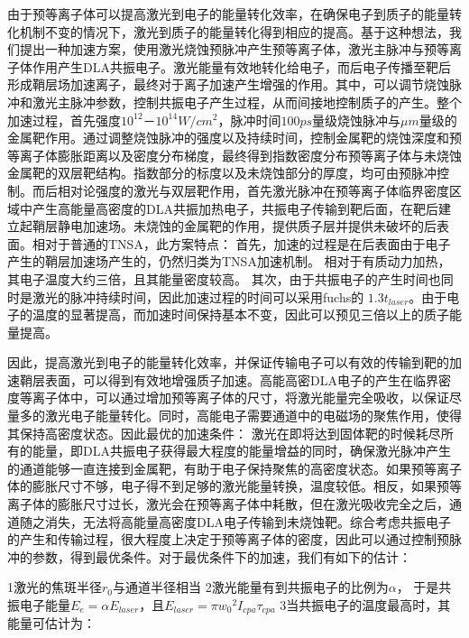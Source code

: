 由于预等离子体可以提高激光到电子的能量转化效率，在确保电子到质子的能量转化机制不变的情况下，激光到质子的能量转化得到相应的提高。基于这种想法，我们提出一种加速方案，使用激光烧蚀预脉冲产生预等离子体，激光主脉冲与预等离子体作用产生DLA共振电子。激光能量有效地转化给电子，而后电子传播至靶后形成鞘层场加速离子，最终对于离子加速产生增强的作用。其中，可以调节烧蚀脉冲和激光主脉冲参数，控制共振电子产生过程，从而间接地控制质子的产生。整个加速过程，首先强度$10^{12}－10^{14} W/cm^2$，脉冲时间$100ps$量级烧蚀脉冲与$\mu m$量级的金属靶作用。通过调整烧蚀脉冲的强度以及持续时间，控制金属靶的烧蚀深度和预等离子体膨胀距离以及密度分布梯度，最终得到指数密度分布预等离子体与未烧蚀金属靶的双层靶结构。指数部分的标度以及未烧蚀部分的厚度，均可由预脉冲控制。而后相对论强度的激光与双层靶作用，首先激光脉冲在预等离子体临界密度区域中产生高能量高密度的DLA共振加热电子，共振电子传输到靶后面，在靶后建立起鞘层静电加速场。未烧蚀的金属靶的作用，提供质子层并提供未破坏的后表面。相对于普通的TNSA，此方案特点：
首先，加速的过程是在后表面由于电子产生的鞘层加速场产生的，仍然归类为TNSA加速机制。
相对于有质动力加热，其电子温度大约三倍，且其能量密度较高。
其次，由于共振电子的产生时间也同时是激光的脉冲持续时间，因此加速过程的时间可以采用fuchs的 $1.3 t_{laser}$。由于电子的温度的显著提高，而加速时间保持基本不变，因此可以预见三倍以上的质子能量提高。





因此，提高激光到电子的能量转化效率，并保证传输电子可以有效的传输到靶的加速鞘层表面，可以得到有效地增强质子加速。高能高密DLA电子的产生在临界密度等离子体中，可以通过增加预等离子体的尺寸，将激光能量完全吸收，以保证尽量多的激光电子能量转化。同时，高能电子需要通道中的电磁场的聚焦作用，使得其保持高密度状态。因此最优的加速条件：
激光在即将达到固体靶的时候耗尽所有的能量，即DLA共振电子获得最大程度的能量增益的同时，确保激光脉冲产生的通道能够一直连接到金属靶，有助于电子保持聚焦的高密度状态。如果预等离子体的膨胀尺寸不够，电子得不到足够的激光能量转换，温度较低。相反，如果预等离子体的膨胀尺寸过长，激光会在预等离子体中耗散，但在激光吸收完全之后，通道随之消失，无法将高能量高密度DLA电子传输到未烧蚀靶。综合考虑共振电子的产生和传输过程，很大程度上决定于预等离子体的密度，因此可以通过控制预脉冲的参数，得到最优条件。对于最优条件下的加速，我们有如下的估计：




1激光的焦斑半径$r_0$与通道半径相当
2激光能量有到共振电子的比例为$\alpha$， 于是共振电子能量$E_{e} =\alpha E_{laser} $，且$E_{laser}=\pi {w_0}^2 I_{cpa} \tau_{cpa}$
3当共振电子的温度最高时，其能量可估计为：

